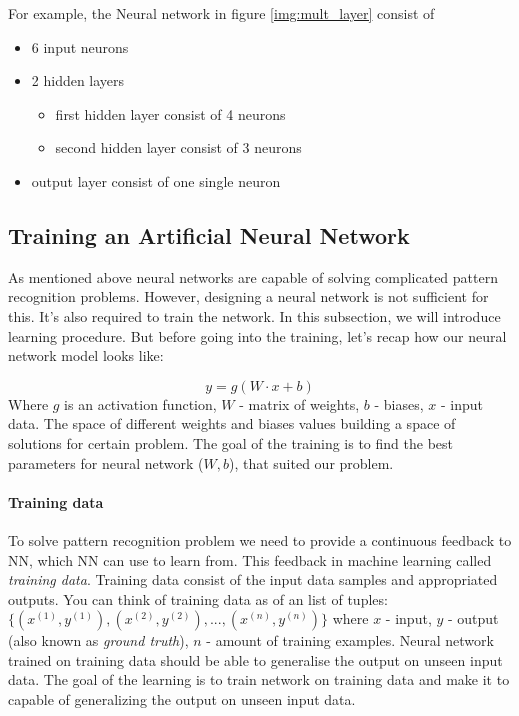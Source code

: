 For example, the Neural network in figure \ref{img:mult_layer} consist of

\begin{itemize}
	\item 6 input neurons
	\item 2 hidden layers
		\begin{itemize}
			\item first hidden layer consist of 4 neurons
			\item second hidden layer consist of 3 neurons
		\end{itemize}
	\item output layer consist of one single neuron
\end{itemize}


\subsection{Training an Artificial Neural Network}
As mentioned above neural networks are capable of solving complicated
pattern recognition problems. However, designing a neural network is not sufficient
for this. It's also required to train the network. In this subsection, we will
introduce learning procedure. But before going into the training, let's recap
how our neural network model looks like:

\begin{equation} \label{eq:nn}
	y = g(W \cdot x + b)
\end{equation}
Where $g$ is an activation function, $W$ - matrix of weights, $b$ - biases, $x$ - input data.
The space of different weights and biases values building a space of solutions for
certain problem. The goal of the training is to find the best parameters
for neural network ($W, b$), that suited our problem.

\paragraph{Training data} To solve pattern recognition problem we need to provide
a continuous feedback to \gls{NN}, which \gls{NN} can use to learn from. This feedback
in machine learning called \emph{training data}.
Training data consist of the input data samples
and appropriated outputs. You can think of training data as of an list of tuples:
${\{(x^{(1)}, y^{(1)}), (x^{(2)}, y^{(2)}), ..., (x^{(n)}, y^{(n)})\}}$ where $x$ - input,
$y$ - output (also known as \emph{ground truth}), $n$ - amount of training examples. Neural network trained on training data
should be able to generalise the output on unseen input data.
The goal of the learning is to train network on training data and make
it to capable of generalizing the output on unseen input data.

